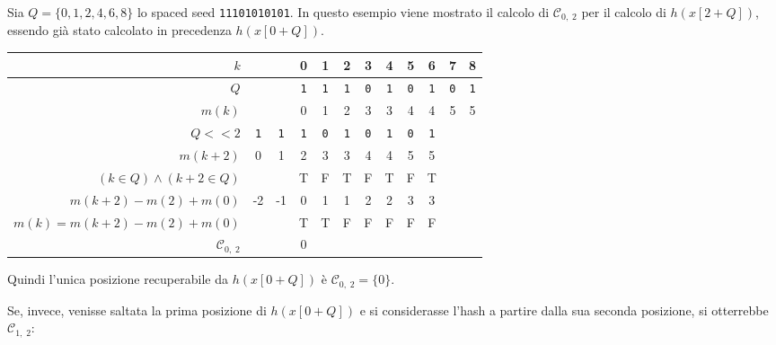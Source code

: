 \begin{example}
	Sia $Q = \{ 0, 1, 2, 4, 6, 8 \}$ lo spaced seed \texttt{11101010101}. In questo esempio viene mostrato il calcolo di $\mathcal{C}_{0,\; 2}$ per il calcolo di $h(x[2 + Q])$, essendo già stato calcolato in precedenza $h(x[0 + Q])$.
	
	\begin{center}
		\begin{tabular}{r || cc|ccccccc|cc}
			$k$ & & & 0 & 1 & 2 & 3 & 4 & 5 & 6 & 7 & 8 \\
			\midrule
			$Q$ & & & \texttt{1} & \texttt{1} & \texttt{1} & \texttt{0} & \texttt{1} & \texttt{0} & \texttt{1} & \texttt{0} & \texttt{1} \\
			$m(k)$ & & & 0 & 1 & 2 & 3 & 3 & 4 & 4 & 5 & 5 \\
			\midrule
			$Q <\!< 2$ & \texttt{1} & \texttt{1} & \texttt{1} & \texttt{0} & \texttt{1} & \texttt{0} & \texttt{1} & \texttt{0} & \texttt{1} & & \\
			$m(k + 2)$ & 0 & 1 & 2 & 3 & 3 & 4 & 4 & 5 & 5 & & \\
			\midrule
			$(k \in Q) \wedge (k + 2 \in Q)$ & & & T & F & T & F & T & F & T & & \\
			\midrule
			$m(k + 2) - m(2) + m(0)$ & -2 & -1 & 0 & 1 & 1 & 2 & 2 & 3 & 3 & & \\
			$m(k) = m(k + 2) - m(2) + m(0)$ & & & T & T & F & F & F & F & F & & \\
			\midrule
			$\mathcal{C}_{0,\; 2}$ & & & 0 & & & & & & & & \\
		\end{tabular}
	\end{center}
	
	Quindi l'unica posizione recuperabile da $h(x[0 + Q])$ è $\mathcal{C}_{0,\; 2} = \{ 0 \}$.
	
	Se, invece, venisse saltata la prima posizione di $h(x[0 + Q])$ e si considerasse l'hash a partire dalla sua seconda posizione, si otterrebbe $\mathcal{C}_{1,\; 2}$:
	

\end{example}
